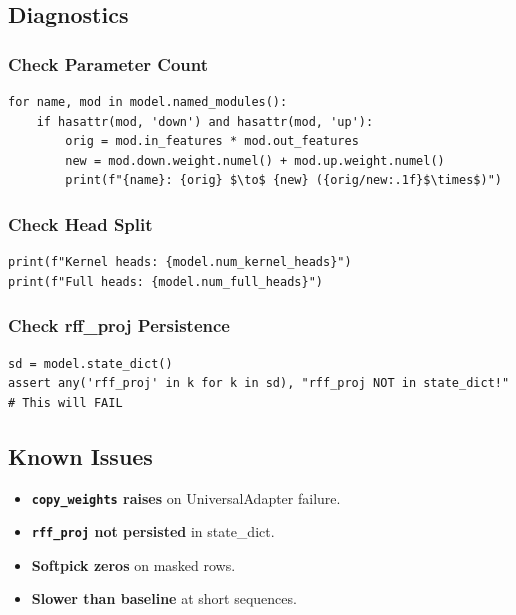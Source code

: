 \subsection{Diagnostics}

\subsubsection{Check Parameter Count}

\begin{lstlisting}
for name, mod in model.named_modules():
    if hasattr(mod, 'down') and hasattr(mod, 'up'):
        orig = mod.in_features * mod.out_features
        new = mod.down.weight.numel() + mod.up.weight.numel()
        print(f"{name}: {orig} $\to$ {new} ({orig/new:.1f}$\times$)")
\end{lstlisting}

\subsubsection{Check Head Split}

\begin{lstlisting}
print(f"Kernel heads: {model.num_kernel_heads}")
print(f"Full heads: {model.num_full_heads}")
\end{lstlisting}

\subsubsection{Check rff\_proj Persistence}

\begin{lstlisting}
sd = model.state_dict()
assert any('rff_proj' in k for k in sd), "rff_proj NOT in state_dict!"  # This will FAIL
\end{lstlisting}

\subsection{Known Issues}

\begin{itemize}
\item \textbf{\texttt{copy\_weights} raises} on UniversalAdapter failure.
\item \textbf{\texttt{rff\_proj} not persisted} in state\_dict.
\item \textbf{Softpick zeros} on masked rows.
\item \textbf{Slower than baseline} at short sequences.

\end{itemize}
